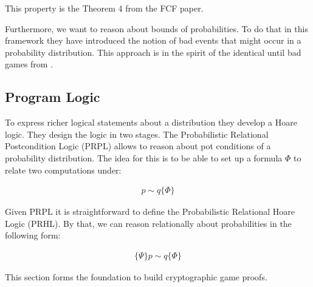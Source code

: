 This property is the Theorem 4 from the FCF paper.

Furthermore, we want to reason about bounds of probabilities. To do that in this
framework they have introduced the notion of bad events that might occur in a
probability distribution. This approach is in the spirit of the identical until bad games
from \cite{Bellare:2006}.


\subsection{Program Logic}
To express richer logical statements about a distribution they develop a
Hoare logic. They design the logic in two stages. The Probabilistic
Relational Postcondition Logic (PRPL) allows to reason about pot conditions
of a probability distribution. The idea for this is to be
able to set up a formula $\Phi$ to relate two computations under:

\begin{align}
    p \sim q \{ \Phi\} 
\end{align}

Given PRPL it is straightforward to define the Probabilistic Relational
Hoare Logic (PRHL). By that, we can reason relationally about probabilities in
the following form:

\begin{align}
    \{ \Psi \} p \sim q \{ \Phi\} 
\end{align}

This section forms the foundation to build cryptographic game proofs.
